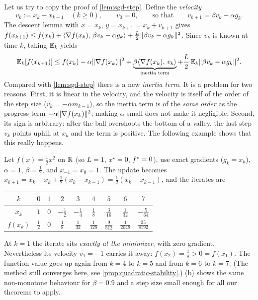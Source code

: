 Let us try to copy the proof of \cref{lem:sgd-step}. Define the \emph{velocity}
\begin{equation}\label{eq:velocity}
  v_k:=x_k-x_{k-1}\quad(k\ge0),\qquad v_0=0,\qquad\text{so that}\qquad
  v_{k+1}=\beta v_k-\alpha g_k .
\end{equation}
The descent lemma with $x=x_k$, $y=x_{k+1}=x_k+v_{k+1}$ gives
$f(x_{k+1})\le f(x_k)+\langle \nabla f(x_k),\, \beta v_k-\alpha g_k\rangle+\frac L2\lVert \beta v_k-\alpha g_k\rVert^2$.
Since $v_k$ is known at time $k$, taking $\mathbb{E}_k$ yields
\begin{equation}\label{eq:naive}
  \mathbb{E}_k[f(x_{k+1})]\le f(x_k)-\alpha\lVert \nabla f(x_k)\rVert^2
  +\underbrace{\beta\langle \nabla f(x_k),\, v_k\rangle}_{\text{inertia term}}
  +\frac L2\,\mathbb{E}_k\lVert \beta v_k-\alpha g_k\rVert^2 .
\end{equation}
Compared with \cref{lem:sgd-step} there is a new \emph{inertia term}. It is a problem for
two reasons. First, it is linear in the velocity, and the velocity is itself of the order
of the step size ($v_k=-\alpha m_{k-1}$), so the inertia term is of the \emph{same order}
as the progress term $-\alpha\lVert \nabla f(x_k)\rVert^2$; making $\alpha$ small does not make
it negligible. Second, its sign is arbitrary: after the ball overshoots the bottom of a
valley, the last step $v_k$ points uphill at $x_k$ and the term is positive. The following
example shows that this really happens.

\begin{example}\label{ex:overshoot}
Let $f(x)=\frac12x^2$ on $\mathbb{R}$ (so $L=1$, $x^\star=0$, $f^\star=0$), use exact gradients
($g_k=x_k$), $\alpha=1$, $\beta=\frac12$, and $x_{-1}=x_0=1$. The update becomes
$x_{k+1}=x_k-x_k+\frac12(x_k-x_{k-1})=\frac12(x_k-x_{k-1})$, and the iterates are
\begin{center}
\renewcommand{\arraystretch}{1.35}
\begin{tabular}{@{}c|cccccccc@{}}
$k$ & $0$ & $1$ & $2$ & $3$ & $4$ & $5$ & $6$ & $7$\\\hline
$x_k$ & $1$ & $0$ & $-\frac12$ & $-\frac14$ & $\frac18$ & $\frac3{16}$ & $\frac1{32}$ & $-\frac5{64}$\\
$f(x_k)$ & $\frac12$ & $0$ & $\frac18$ & $\frac1{32}$ & $\frac1{128}$ & $\frac9{512}$ & $\frac1{2048}$ & $\frac{25}{8192}$
\end{tabular}
\end{center}
At $k=1$ the iterate sits \emph{exactly at the minimizer}, with zero gradient. Nevertheless
its velocity $v_1=-1$ carries it away: $f(x_2)=\frac18>0=f(x_1)$. The function value goes
up again from $k=4$ to $k=5$ and from $k=6$ to $k=7$. (The method still converges here, see
\cref{prop:quadratic-stability}.) (b) shows the same non-monotone
behaviour for $\beta=0.9$ and a step size small enough for all our theorems to apply.
\end{example}

